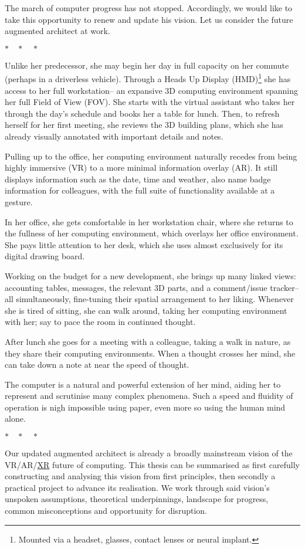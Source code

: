 \documentclass[logo,bsc,singlespacing,parskip]{infthesis}
\newcommand{\threestars}{\begin{center}$ {\ast}\quad{\ast}\quad{\ast} $\end{center}}
\begin{document}
The march of computer progress has not stopped.
Accordingly, we would like to take this opportunity to renew and update his vision.
Let us consider the future augmented architect at work.
\threestars

Unlike her predecessor, she may begin her day in full capacity on her commute (perhaps in a driverless vehicle).
Through a Heads Up Display (HMD)\footnote{Mounted via a headset, glasses, contact lenses or neural implant.} she has access to her full workstation-- an expansive 3D computing environment spanning her full Field of View (FOV).
She starts with the virtual assistant who takes her through the day's schedule and books her a table for lunch.
Then, to refresh herself for her first meeting, she reviews the 3D building plans, which she has already visually annotated with important details and notes.

Pulling up to the office, her computing environment naturally recedes from being highly immersive (VR) to a more minimal information overlay (AR).
It still displays information such as the date, time and weather, also name badge information for colleagues, with the full suite of functionality available at a gesture.

In her office, she gets comfortable in her workstation chair, where she returns to the fullness of her computing environment, which overlays her office environment.
She pays little attention to her desk, which she uses almost exclusively for its digital drawing board.

Working on the budget for a new development, she brings up many linked views: accounting tables, messages, the relevant 3D parts, and a comment/issue tracker-- all simultaneously, fine-tuning their spatial arrangement to her liking.
Whenever she is tired of sitting, she can walk around, taking her computing environment with her; say to pace the room in continued thought.

After lunch she goes for a meeting with a colleague, taking a walk in nature, as they share their computing environments.
When a thought crosses her mind, she can take down a note at near the speed of thought.

The computer is a natural and powerful extension of her mind, aiding her to represent and scrutinise many complex phenomena.
Such a speed and fluidity of operation is nigh impossible using paper, even more so using the human mind alone.

\threestars
Our updated augmented architect is already a broadly mainstream vision of the VR/AR/\hyperref[org1d567af]{XR} future of computing.
This thesis can be summarised as first carefully constructing and analysing this vision from first principles, then secondly a practical project to advance its realisation.
We work through said vision's unspoken assumptions, theoretical underpinnings, landscape for progress, common misconceptions and opportunity for disruption.
\end{document}
